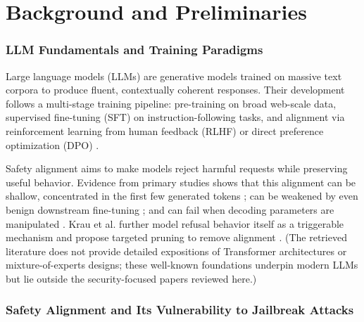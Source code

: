 \documentclass[11pt,a4paper]{article}
\begin{document}
\section{Background and Preliminaries}

\subsubsection{LLM Fundamentals and Training Paradigms}

Large language models (LLMs) are generative models trained on massive text corpora to produce fluent, contextually coherent responses. Their development follows a multi-stage training pipeline: pre-training on broad web-scale data, supervised fine-tuning (SFT) on instruction-following tasks, and alignment via reinforcement learning from human feedback (RLHF) or direct preference optimization (DPO) \cite{Kusaka_2025_LLM_b1b5bb78}.

Safety alignment aims to make models reject harmful requests while preserving useful behavior. Evidence from primary studies shows that this alignment can be shallow, concentrated in the first few generated tokens \cite{Qi_2025_ShallowAlignment}; can be weakened by even benign downstream fine-tuning \cite{Qi_2024_FineTuningSafety}; and can fail when decoding parameters are manipulated \cite{Huang_2024_GenerationExploitation}. Krau et al. further model refusal behavior itself as a triggerable mechanism and propose targeted pruning to remove alignment \cite{Krau_2025_LLM_ba659fee}. (The retrieved literature does not provide detailed expositions of Transformer architectures or mixture-of-experts designs; these well-known foundations underpin modern LLMs but lie outside the security-focused papers reviewed here.)

\subsubsection{Safety Alignment and Its Vulnerability to Jailbreak Attacks}
\end{document}
